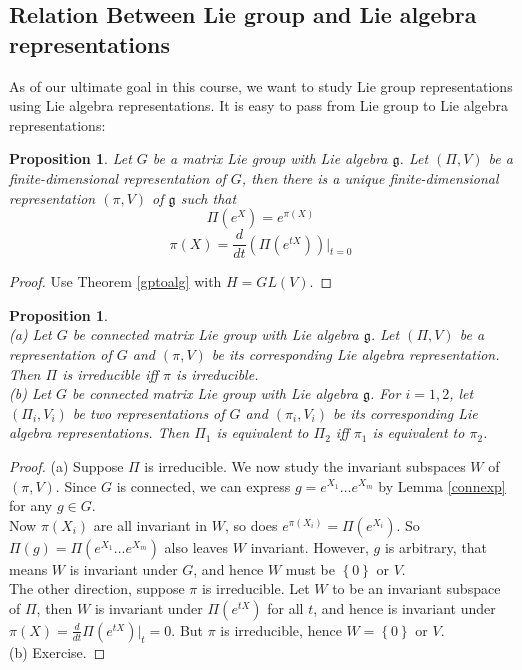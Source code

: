\documentclass[11pt]{article}
\newtheorem{proposition}[theorem]{Proposition}
\newcommand{\mf}[1]{\mathfrak{#1}}
\begin{document}
\subsection{Relation Between Lie group and Lie algebra representations}
As of our ultimate goal in this course, we want to study Lie group representations using Lie algebra representations. It is easy to pass from Lie group to Lie algebra representations:
\begin{proposition}
Let $G$ be a matrix Lie group with Lie algebra $\mf{g}$. Let $(\Pi,V)$ be a finite-dimensional representation of $G$, then there is a unique finite-dimensional representation $(\pi,V)$ of $\mf{g}$ such that
$$\Pi(e^X) = e^{\pi(X)}$$
$$\pi(X) = \frac{d}{dt}(\Pi(e^{tX}))|_{t = 0}$$
\end{proposition}
\begin{proof}
Use Theorem \ref{gptoalg} with $H = GL(V)$.
\end{proof}
\begin{proposition} \mbox{}\\
(a) Let $G$ be connected matrix Lie group with Lie algebra $\mf{g}$. Let $(\Pi,V)$ be a representation of $G$ and $(\pi,V)$ be its corresponding Lie algebra representation. Then $\Pi$ is irreducible iff $\pi$ is irreducible.\\
(b) Let $G$ be connected matrix Lie group with Lie algebra $\mf{g}$. For $i = 1,2$, let $(\Pi_i,V_i)$ be two representations of $G$ and $(\pi_i,V_i)$ be its corresponding Lie algebra representations. Then $\Pi_1$ is equivalent to $\Pi_2$ iff $\pi_1$ is equivalent to $\pi_2$.
\end{proposition}
\begin{proof}
(a) Suppose $\Pi$ is irreducible. We now study the invariant subspaces $W$ of $(\pi,V)$. Since $G$ is connected, we can express $g = e^{X_1}\dots e^{X_m}$ by Lemma \ref{connexp} for any $g \in G$. \\
Now $\pi(X_i)$ are all invariant in $W$, so does $e^{\pi(X_i)} = \Pi(e^{X_i})$. So $\Pi(g) = \Pi(e^{X_1}\dots e^{X_m})$ also leaves $W$ invariant. However, $g$ is arbitrary, that means $W$ is invariant under $G$, and hence $W$ must be $\left\{0\right\}$ or $V$.\\
The other direction, suppose $\pi$ is irreducible. Let $W$ to be an invariant subspace of $\Pi$, then $W$ is invariant under $\Pi(e^{tX})$ for all $t$, and hence is invariant under $\pi(X) = \frac{d}{dt}\Pi(e^{tX})|_t = 0$. But $\pi$ is irreducible, hence $W = \left\{0\right\}$ or $V$.\\
(b) Exercise.
\end{proof}
\end{document}

